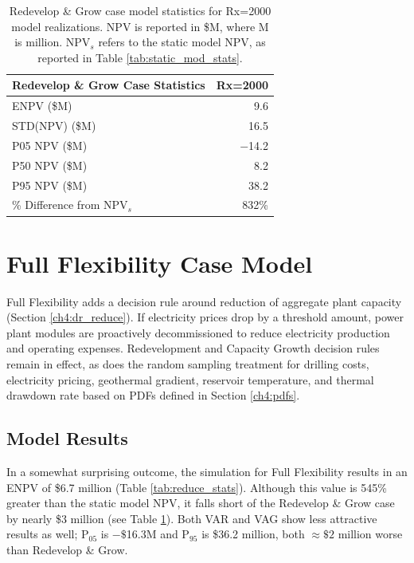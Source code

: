 \begin{table}[H]
\centering
\begin{tabular}{|l|r|}
\hline
\textbf{Redevelop \& Grow Case Statistics} & Rx=2000 \\ \hline
ENPV (\$M) & 9.6 \\ \hline
STD(NPV) (\$M) & 16.5 \\ \hline
P05 NPV (\$M) & $\boldsymbol{-}$14.2 \\ \hline
P50 NPV (\$M) & 8.2 \\ \hline
P95 NPV (\$M) & 38.2 \\ \hline
\% Difference from NPV$_{s}$ & 832\% \\ \hline
\end{tabular}
\caption[Redevelop \& Grow Case statistics]{Redevelop \& Grow case model statistics for Rx=2000 model realizations. NPV is reported in \$M, where M is million. NPV$_s$ refers to the static model NPV, as reported in Table \ref{tab:static_mod_stats}.}
\label{tab:grow_stats}
\end{table}

\section{Full Flexibility Case Model}\label{ch6:reduce_case}

Full Flexibility adds a decision rule around reduction of aggregate plant capacity (Section \ref{ch4:dr_reduce}). If electricity prices drop by a threshold amount, power plant modules are proactively decommissioned to reduce electricity production and operating expenses. Redevelopment and Capacity Growth decision rules remain in effect, as does the random sampling treatment for drilling costs, electricity pricing, geothermal gradient, reservoir temperature, and thermal drawdown rate based on PDFs defined in Section \ref{ch4:pdfs}.

\subsection{Model Results}\label{ch6:reduce_results}
In a somewhat surprising outcome, the simulation for Full Flexibility results in an ENPV of \$6.7 million (Table \ref{tab:reduce_stats}). Although this value is 545\% greater than the static model NPV, it falls short of the Redevelop \& Grow case by nearly \$3 million (see Table \ref{tab:grow_stats}). Both VAR and VAG show less attractive results as well; P$_{05}$ is $-\$$16.3M and P$_{95}$ is \$36.2 million, both $\approx\$2$ million worse than Redevelop \& Grow.  

